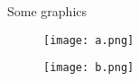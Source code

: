 \documentclass[a4paper,12pt]{article}
\begin{document}
%
\noindent
{\Large Some graphics}
%
\begin{figure}[h]
\centering
\texttt{[image: a.png]}
\end{figure}
%
\begin{figure}[h]
\centering
\texttt{[image: b.png]}
\end{figure}
%
\end{document}

